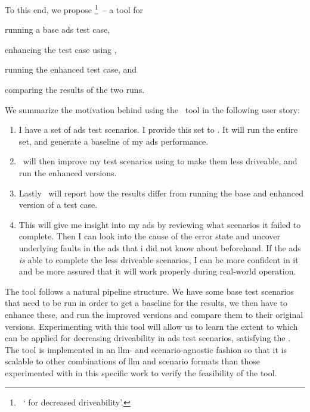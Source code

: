 To this end, we propose \hefe\footnote{~` for decreased driveability'.}~-- a tool for
\begin{inparaenum}
    \item running a base \acrshort{ads} test case,
    \item enhancing the test case using ,
    \item running the enhanced test case, and
    \item comparing the results of the two runs.
\end{inparaenum}
We summarize the motivation behind using the \hefe~tool in the following user story:

\begin{enumerate}
    \item I have a set of \acrshort{ads} test scenarios. I provide this
          set to \hefe. It will run the entire set, and generate a
          baseline of my \acrshort{ads} performance.

    \item \hefe~will then improve my test scenarios using
           to make them less driveable,  and run the
          enhanced versions.

    \item Lastly \hefe~will report how the results differ from running
          the base and enhanced version of a test case.

    \item This will give me insight into my \acrshort{ads} by reviewing
          what scenarios it failed to complete. Then I can look into the
          cause of the error state and uncover underlying faults in the
          \acrshort{ads} that i did not know about beforehand. If the
          \acrshort{ads} \emph{is} able to complete the less driveable
          scenarios, I can be more confident in it and be more assured
          that it will work properly during real-world operation.
\end{enumerate}

The tool follows a natural pipeline structure. We have some base test scenarios that
need to be run in order to get a baseline for the results, we then have to
enhance these, and run the improved versions and compare them to their original
versions.
Experimenting with this tool will allow us to learn the extent to which
 can be applied for decreasing  driveability in \acrshort{ads}
test scenarios, satisfying the . The tool is
implemented in an \acrshort{llm}- and scenario-agnostic fashion so that it is
scalable to other combinations of \acrshort{llm} and scenario formats than those
experimented with in this specific work to verify the feasibility of the tool.

